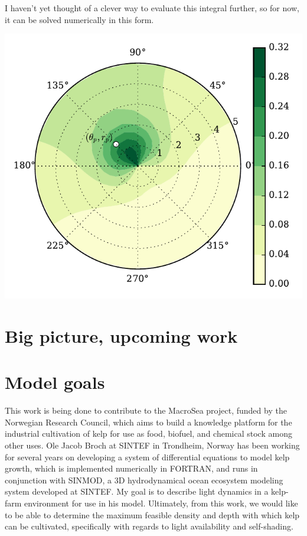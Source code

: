 \documentclass[10pt]{article}
\newenvironment{mcfig}
	{\par\medskip\noindent\minipage{\linewidth}}
	{\endminipage\par\medskip}
\begin{document}
\begin{multicols}{2}
I haven't yet thought of a clever way to evaluate this integral further, so for now, it can be solved numerically in this form.

\begin{mcfig}
	\centering
	\includegraphics[width=\linewidth]{prob_shade}
	\vspace{-2em}
	\label{fig:prob_shade}
\end{mcfig}

\section{Big picture, upcoming work}
\section{Model goals}
This work is being done to contribute to the MacroSea project, funded by the Norwegian Research Council, which aims to build a knowledge platform for the industrial cultivation of kelp for use as food, biofuel, and chemical stock among other uses.
Ole Jacob Broch at SINTEF in Trondheim, Norway has been working for several years on developing a system of differential equations to model kelp growth, which is implemented numerically in FORTRAN, and runs in conjunction with SINMOD, a 3D hydrodynamical ocean ecosystem modeling system developed at SINTEF.
My goal is to describe light dynamics in a kelp-farm environment for use in his model.
Ultimately, from this work, we would like to be able to determine the maximum feasible density and depth with which kelp can be cultivated, specifically with regards to light availability and self-shading.


\end{multicols}
\end{document}
